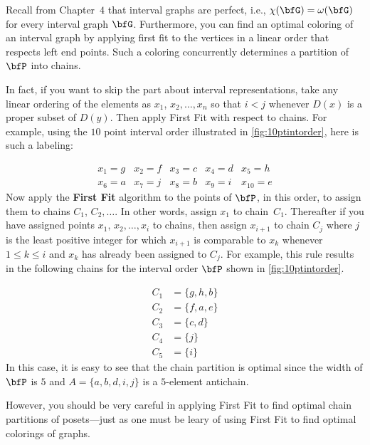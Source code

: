 Recall from Chapter~$4$ that interval graphs are perfect, i.e.,
$\chi(\bfG)=\omega(\bfG)$ for every interval graph $\bfG$.  Furthermore,
you can find an optimal coloring of an interval graph by applying first fit
to the vertices in a linear order that respects left end points.
Such a coloring concurrently determines a partition of $\bfP$ into
chains.

In fact, if you want to skip the part about interval representations,
take any linear ordering of the elements as $x_1$, $x_2,\dots,x_n$ so that
$i<j$ whenever $D(x)$ is a proper subset of $D(y)$.  Then apply First
Fit with respect to chains.  For example, using
the $10$ point interval order illustrated in \autoref{fig:10ptintorder},
here is such a labeling: 

\[\begin{array}{ccccc}
x_1 =g &
x_2 =f &
x_3 =c &
x_4 =d &
x_5 =h\\
x_6 =a &
x_7 =j &
x_8 =b &
x_9 =i &
x_{10} =e
\end{array}\]
Now apply the \textbf{First Fit} algorithm to the points of $\bfP$,
in this order, to assign them to chains $C_1$, $C_2,\dots$.  In other
words, assign $x_1$ to chain~$C_1$.  Thereafter if you have
assigned points $x_1$, $x_2,\dots,x_i$ to chains, then assign
$x_{i+1}$ to chain $C_j$ where $j$ is the least positive integer
for which $x_{i+1}$ is comparable to $x_k$ whenever $1\le k\le i$ and
$x_k$ has already been assigned to $C_j$.
For example, this rule results in the following chains for the
interval order $\bfP$ shown in \autoref{fig:10ptintorder}.

\begin{align*}
C_1 &= \{g,h,b\}\\ 
C_2 &= \{f,a,e\}\\
C_3 &= \{c,d\}\\
C_4 &= \{j\}\\
C_5 &= \{i\}
\end{align*}
In this case, it is easy to see that the chain partition is
optimal since the width of $\bfP$ is $5$ and $A=\{a,b,d,i,j\}$
is a $5$-element antichain.

However, you should be very careful in applying First Fit to find
optimal chain partitions of posets---just as one must be leary of
using First Fit to find optimal colorings of graphs.

